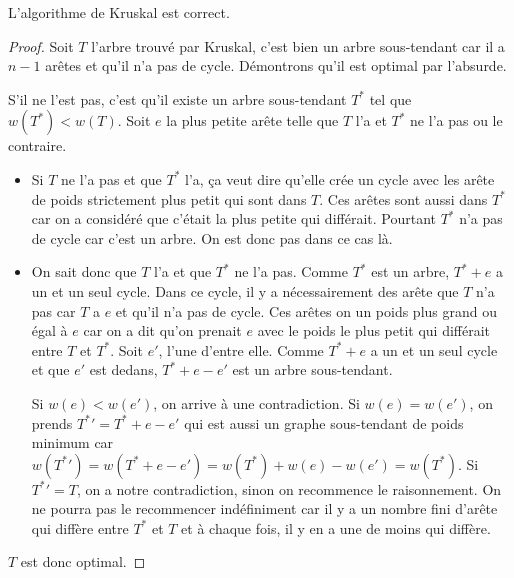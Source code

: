\begin{mytheo}
  L'algorithme de Kruskal est correct.
  \begin{proof}
    Soit $T$ l'arbre trouvé par Kruskal,
    c'est bien un arbre sous-tendant car il a $n-1$ arêtes et qu'il n'a pas de cycle.
    Démontrons qu'il est optimal par l'absurde.

    S'il ne l'est pas, c'est qu'il existe un arbre sous-tendant $T^*$ tel que $w(T^*) < w(T)$.
    Soit $e$ la plus petite arête telle que $T$ l'a et $T^*$ ne l'a pas ou le contraire.
    \begin{itemize}
      \item Si $T$ ne l'a pas et que $T^*$ l'a, ça veut dire qu'elle crée un cycle avec les
        arête de poids strictement plus petit qui sont dans $T$.
        Ces arêtes sont aussi dans $T^*$ car on a considéré que c'était la plus petite qui différait.
        Pourtant $T^*$ n'a pas de cycle car c'est un arbre. On est donc pas dans ce cas là.
      \item On sait donc que $T$ l'a et que $T^*$ ne l'a pas.
        Comme $T^*$ est un arbre, $T^* + e$ a un et un seul cycle.
        Dans ce cycle, il y a nécessairement des arête que $T$ n'a pas car $T$ a $e$ et qu'il n'a pas de cycle.
        Ces arêtes on un poids plus grand ou égal à $e$ car on a dit qu'on prenait $e$ avec le poids
        le plus petit qui différait entre $T$ et $T^*$. Soit $e'$, l'une d'entre elle.
        Comme $T^*+e$ a un et un seul cycle et que $e'$ est dedans, $T^*+e-e'$ est un arbre sous-tendant.

        Si $w(e) < w(e')$, on arrive à une contradiction.
        Si $w(e) = w(e')$, on prends ${T^*}'=T^*+e-e'$ qui est aussi
        un graphe sous-tendant de poids minimum car $w({T^*}') = w(T^*+e-e') = w(T^*)+w(e)-w(e') = w(T^*)$.
        Si ${T^*}' = T$, on a notre contradiction, sinon on recommence le raisonnement.
        On ne pourra pas le recommencer indéfiniment car il y a un nombre fini d'arête qui diffère entre $T^*$
        et $T$ et à chaque fois, il y en a une de moins qui diffère.
    \end{itemize}
    $T$ est donc optimal.
   \end{proof}
\end{mytheo}


